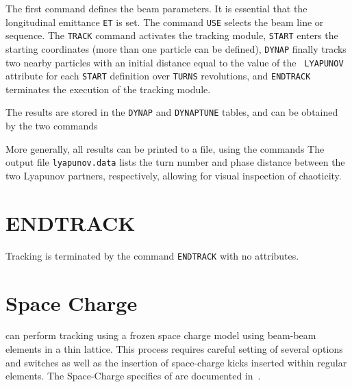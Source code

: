
The first command defines the beam parameters. It is  essential that the
longitudinal emittance \texttt{ET} is set. The command \texttt{USE}
selects the beam line or sequence. The \texttt{TRACK} command activates the
tracking module, \texttt{START} enters the starting coordinates (more
than one particle can be defined),  \texttt{DYNAP} finally tracks two
nearby particles  with an initial distance equal to the value of the \texttt{
LYAPUNOV} attribute  for each
\texttt{START} definition over \texttt{TURNS} revolutions, and
\texttt{ENDTRACK} terminates the execution of the tracking module. 

The results are stored in the \texttt{DYNAP} and \texttt{DYNAPTUNE}
tables, and can be obtained by the two commands  
 

More generally, all results can be printed to a file, using the commands 
The output file \texttt{lyapunov.data} lists the turn number and phase
distance between the two Lyapunov partners, respectively, allowing for
visual inspection of chaoticity.
 
\section{ENDTRACK}
\label{sec:endtrack}

Tracking is terminated by the command \texttt{ENDTRACK} with no
attributes. 


\section{Space Charge}

\madx can perform tracking using a frozen space charge model using
beam-beam elements in a thin lattice. This process requires careful
setting of several options and switches as well as the insertion of
space-charge kicks inserted within  regular elements. The Space-Charge
specifics of \madx are documented in~\cite{kapin2013}.


